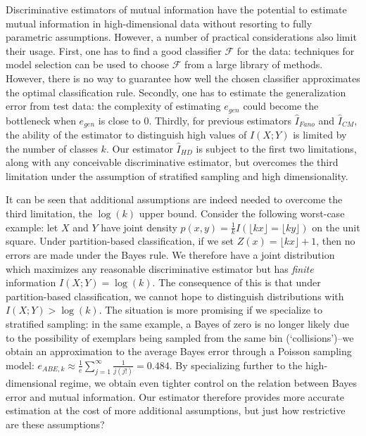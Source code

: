 \documentclass{article}
\begin{document}
Discriminative estimators of mutual information have the potential to
estimate mutual information in high-dimensional data without resorting
to fully parametric assumptions.  However, a number of practical
considerations also limit their usage.  First, one has to find a good
classifier $\mathcal{F}$ for the data: techniques for model selection
can be used to choose $\mathcal{F}$ from a large library of methods.
However, there is no way to guarantee how well the chosen classifier
approximates the optimal classification rule.  Secondly, one has to
estimate the generalization error from test data: the complexity of
estimating $e_{gen}$ could become the bottleneck when $e_{gen}$ is
close to 0.  Thirdly, for previous estimators $\hat{I}_{Fano}$ and
$\hat{I}_{CM}$, the ability of the estimator to distinguish high
values of $I(X; Y)$ is limited by the number of classes $k$.  
Our estimator $\hat{I}_{HD}$ is subject to the first two limitations,
along with any conceivable discriminative estimator, but overcomes the
third limitation under the assumption of stratified sampling and high
dimensionality.

It can be seen that additional assumptions are indeed needed to overcome the third limitation,
the  $\log(k)$ upper bound.  Consider the following worst-case example: let $X$ and $Y$ have joint density $
p(x, y) = \frac{1}{k}I(\lfloor kx \rfloor = \lfloor ky \rfloor) $ on
the unit square.  Under partition-based classification, if we set
$Z(x) = \lfloor kx \rfloor + 1$, then no errors are made under the
Bayes rule. We therefore have a joint distribution which maximizes any
reasonable discriminative estimator but has \emph{finite} information
$I(X; Y) = \log(k)$.  The consequence of this is that under
partition-based classification, we cannot hope to distinguish
distributions with $I(X; Y) > \log(k)$.  The situation is more
promising if we specialize to stratified sampling: in the same
example, a Bayes of zero is no longer likely due to the possibility of
exemplars being sampled from the same bin (`collisions')--we obtain an
approximation to the average Bayes error through a Poisson sampling
model: $e_{ABE, k} \approx \frac{1}{e}\sum_{j=1}^\infty
\frac{1}{j(j!)}= 0.484$.  By specializing further to the high-dimensional regime,
we obtain even tighter control on the relation between Bayes error and mutual information.
Our estimator therefore provides more accurate estimation at the cost of more additional assumptions,
but just how restrictive are these assumptions?
\end{document}

